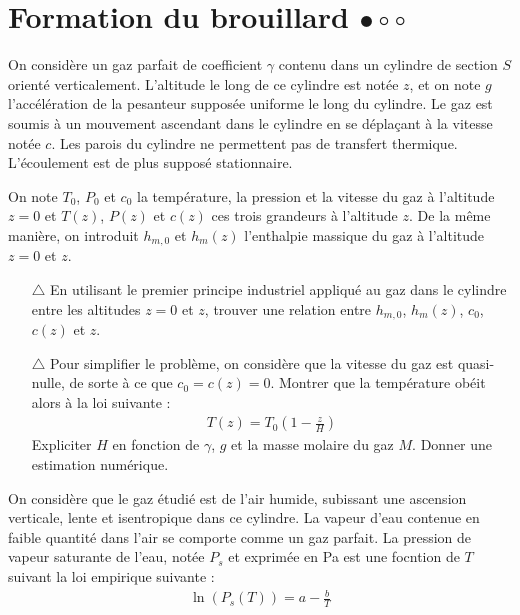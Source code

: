 \documentclass{report}
\begin{document}
\newpage

\section*{Formation du brouillard $\bullet\circ\circ$}

On considère un gaz parfait de coefficient $\gamma$ contenu dans un cylindre de section $S$ orienté verticalement. L'altitude le long de ce cylindre est notée $z$, et on note $g$ l'accélération de la pesanteur supposée uniforme le long du cylindre. Le gaz est soumis à un mouvement ascendant dans le cylindre en se déplaçant à la vitesse notée $c$. Les parois du cylindre ne permettent pas de transfert thermique. L'écoulement est de plus supposé stationnaire.

On note $T_0$, $P_0$ et $c_0$ la température, la pression et la vitesse du gaz à l'altitude $z=0$ et $T(z)$, $P(z)$ et $c(z)$ ces trois grandeurs à l'altitude $z$. De la même manière, on introduit $h_{m,0}$ et $h_m(z)$ l'enthalpie massique du gaz à l'altitude $z=0$ et $z$.

\begin{itemize}
	
	\item[$\triangle$] En utilisant le premier principe industriel appliqué au gaz dans le cylindre entre les altitudes $z=0$ et $z$, trouver une relation entre $h_{m,0}$, $h_m(z)$, $c_0$, $c(z)$ et $z$.
	
	\item[$\triangle$] Pour simplifier le problème, on considère que la vitesse du gaz est quasi-nulle, de sorte à ce que $c_0=c(z)=0$. Montrer que la température obéit alors à la loi suivante :
	\begin{align*}
		T(z)=T_0\left( 1-\frac{z}{H}\right) 
	\end{align*}
	Expliciter $H$ en fonction de $\gamma$, $g$ et la masse molaire du gaz $M$. Donner une estimation numérique.
	
\end{itemize}

On considère que le gaz étudié est de l'air humide, subissant une ascension verticale, lente et isentropique dans ce cylindre. La vapeur d'eau contenue en faible quantité dans l'air se comporte comme un gaz parfait. La pression de vapeur saturante de l'eau, notée $P_s$ et exprimée en Pa est une focntion de $T$ suivant la loi empirique suivante :
\begin{align*}
	\ln(P_s(T)) = a -\frac{b}{T}
\end{align*}
\end{document}
